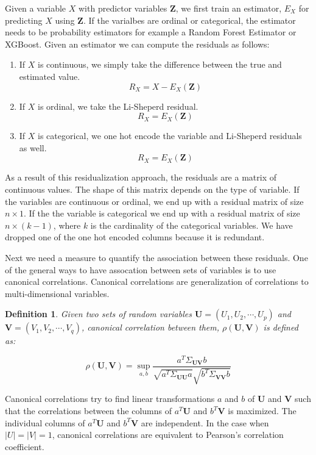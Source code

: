 \documentclass[letterpaper]{article} %
\newtheorem{definition}{Definition}
\begin{document}
Given a variable $ X $ with predictor variables $ \bm{Z} $, we first train an
estimator, $ E_X $ for predicting $ X $ using $ \bm{Z} $. If the varialbes are
ordinal or categorical, the estimator needs to be probability estimators for
example a Random Forest Estimator or XGBoost. Given an estimator we can compute
the residuals as follows:
\begin{enumerate}
	\item If $ X $ is continuous, we simply take the difference between the true and estimated value.
		$$ R_X = X - E_X(\bm{Z}) $$
	\item If $ X $ is ordinal, we take the Li-Sheperd residual.
		$$ R_X = E_X(\bm{Z}) $$
	\item If $ X $ is categorical, we one hot encode the variable and Li-Sheperd residuals as well.
		$$ R_X = E_X(\bm{Z}) $$
\end{enumerate}
As a result of this residualization approach, the residuals are a matrix of
continuous values. The shape of this matrix depends on the type of variable. If
the variables are continuous or ordinal, we end up with a residual matrix of
size $ n \times 1 $. If the the variable is categorical we end up with a
residual matrix of size $ n \times (k-1) $, where $ k $ is the cardinality of
the categorical variables. We have dropped one of the one hot encoded columns
because it is redundant.

Next we need a measure to quantify the association between these residuals. One
of the general ways to have assocation between sets of variables is to use
canonical correlations. Canonical correlations are generalization of
correlations to multi-dimensional variables.

\begin{definition}
	Given two sets of random variables $ \bm{U} = (U_1, U_2, \cdots, U_p) $
	and $ \bm{V} = (V_1, V_2, \cdots, V_q) $, canonical correlation between
	them, $\rho(\bm{U}, \bm{V}) $ is defined as:
		
	\begin{equation}
		\rho(\bm{U}, \bm{V}) = \sup_{a, b} \frac{a^T \Sigma_{\bm{U}\bm{V}} b}{\sqrt{a^T \Sigma_{\bm{U}\bm{U}} a} \sqrt{b^T \Sigma_{\bm{V}\bm{V}} b}}
	\end{equation}

\end{definition}
	
	Canonical correlations try to find linear transformations $ a $ and $ b
	$ of $ \bm{U} $ and $ \bm{V} $ such that the correlations between the
	columns of $ a^T \bm{U} $ and $ b^T \bm{V} $ is maximized. The
	individual columns of $ a^T \bm{U} $ and $ b^T \bm{V} $ are
	independent. In the case when $ \rvert U \rvert = \rvert V \rvert = 1$,
	canonical correlations are equivalent to Pearson's correlation
	coefficient.
\end{document}
